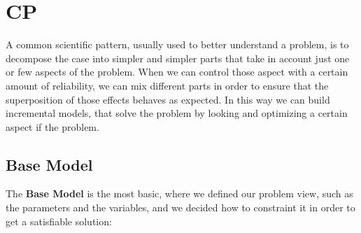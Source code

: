 \chapter{CP}
A common scientific pattern, usually used to better understand a problem, is to decompose the case into
simpler and simpler parts that take in account just one or few aspects of the problem.
When we can control those aspect with a certain amount of reliability, we can mix different parts in order to
ensure that the superposition of those effects behaves as expected.
In this way we can build incremental models, that solve the problem by looking and optimizing a certain aspect
if the problem. 

\section{Base Model}
The \textbf{Base Model} is the most basic, where we defined our problem view, such as the parameters and the variables,
and we decided how to constraint it in order to get a satisfiable solution:

